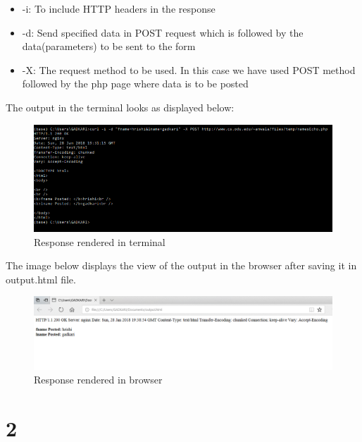 \documentclass[letterpaper,12pt]{article}
\begin{document}
\begin{itemize}
  \item -i: To include HTTP headers in the response
  \item -d: Send specified data in POST request which is followed by the data(parameters) to be sent to the form
  \item -X: The request method to be used. In this case we have used POST method followed by the php page where data is to be posted
\end{itemize}

The output in the terminal looks as displayed below:

\clearpage

\begin{figure}[h]
\includegraphics[scale=0.8]{Response.png}
\caption{ Response rendered in terminal}
\label{fig:q1Response}
\end{figure}



The image below displays the view of the output in the browser after saving it in output.html file.

\begin{figure}[h]
\includegraphics[scale=0.5]{WebResponse.png}
\caption{Response rendered in browser}
\label{fig:q1BrowserResponse}
\end{figure}


\clearpage


\section*{2}
\end{document}
